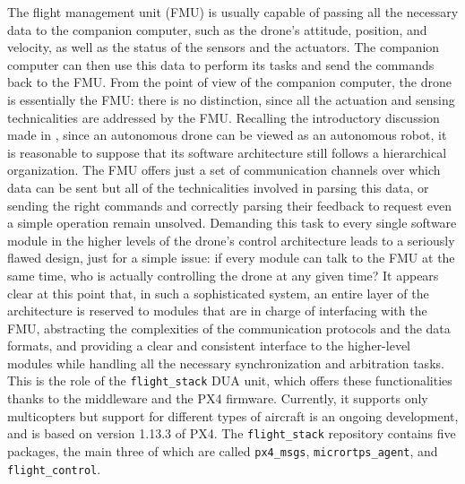 The flight management unit (FMU) is usually capable of passing all the necessary data to the companion computer, such as the drone's attitude, position, and velocity, as well as the status of the sensors and the actuators. The companion computer can then use this data to perform its tasks and send the commands back to the FMU. From the point of view of the companion computer, the drone is essentially the FMU: there is no distinction, since all the actuation and sensing technicalities are addressed by the FMU. Recalling the introductory discussion made in , since an autonomous drone can be viewed as an autonomous robot, it is reasonable to suppose that its software architecture still follows a hierarchical organization. The FMU offers just a set of communication channels over which data can be sent but all of the technicalities involved in parsing this data, or sending the right commands and correctly parsing their feedback to request even a simple operation remain unsolved. Demanding this task to every single software module in the higher levels of the drone's control architecture leads to a seriously flawed design, just for a simple issue: if every module can talk to the FMU at the same time, who is actually controlling the drone at any given time? It appears clear at this point that, in such a sophisticated system, an entire layer of the architecture is reserved to modules that are in charge of interfacing with the FMU, abstracting the complexities of the communication protocols and the data formats, and providing a clear and consistent interface to the higher-level modules while handling all the necessary synchronization and arbitration tasks. This is the role of the \texttt{flight\_stack} \cite{masocco_flight_stack_nodate} DUA unit, which offers these functionalities thanks to the \ROS middleware and the PX4 firmware. Currently, it supports only multicopters but support for different types of aircraft is an ongoing development, and is based on version 1.13.3 of PX4. The \texttt{flight\_stack} repository contains five \ROS packages, the main three of which are called \texttt{px4\_msgs}, \texttt{micrortps\_agent}, and \texttt{flight\_control}.

